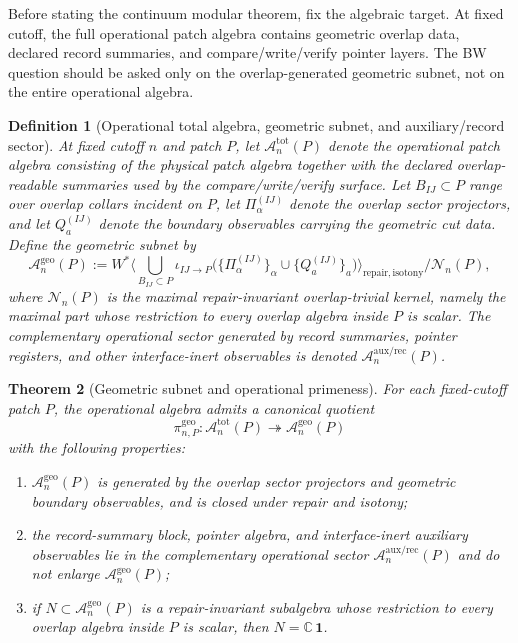 \documentclass[11pt]{article}
\newtheorem{theorem}{Theorem}[section]
\newtheorem{definition}[theorem]{Definition}
\begin{document}
Before stating the continuum modular theorem, fix the algebraic target. At fixed cutoff, the full operational patch algebra contains geometric overlap data, declared record summaries, and compare/write/verify pointer layers. The BW question should be asked only on the overlap-generated geometric subnet, not on the entire operational algebra.

\begin{definition}[Operational total algebra, geometric subnet, and auxiliary/record sector]\label{def:geosubnet}
At fixed cutoff \(n\) and patch \(P\), let \(\mathcal A_n^{\mathrm{tot}}(P)\) denote the operational patch algebra consisting of the physical patch algebra together with the declared overlap-readable summaries used by the compare/write/verify surface. Let \(B_{IJ}\subset P\) range over overlap collars incident on \(P\), let \(\Pi_\alpha^{(IJ)}\) denote the overlap sector projectors, and let \(Q_a^{(IJ)}\) denote the boundary observables carrying the geometric cut data. Define the geometric subnet by
\[
\mathcal A_n^{\mathrm{geo}}(P)
:=
W^\ast\!\Big\langle
\bigcup_{B_{IJ}\subset P}
\iota_{IJ\to P}\!\bigl(
\{\Pi_\alpha^{(IJ)}\}_\alpha\cup\{Q_a^{(IJ)}\}_a
\bigr)
\Big\rangle_{\mathrm{repair,isotony}}
\Big/
\mathcal N_n(P),
\]
where \(\mathcal N_n(P)\) is the maximal repair-invariant overlap-trivial kernel, namely the maximal part whose restriction to every overlap algebra inside \(P\) is scalar. The complementary operational sector generated by record summaries, pointer registers, and other interface-inert observables is denoted \(\mathcal A_n^{\mathrm{aux/rec}}(P)\).
\end{definition}

\begin{theorem}[Geometric subnet and operational primeness]\label{thm:geosubnet}
For each fixed-cutoff patch \(P\), the operational algebra admits a canonical quotient
\[
\pi_{n,P}^{\mathrm{geo}}:\mathcal A_n^{\mathrm{tot}}(P)\twoheadrightarrow \mathcal A_n^{\mathrm{geo}}(P)
\]
with the following properties:
\begin{enumerate}[label=\textup{(\roman*)},leftmargin=2em]
\item \(\mathcal A_n^{\mathrm{geo}}(P)\) is generated by the overlap sector projectors and geometric boundary observables, and is closed under repair and isotony;
\item the record-summary block, pointer algebra, and interface-inert auxiliary observables lie in the complementary operational sector \(\mathcal A_n^{\mathrm{aux/rec}}(P)\) and do not enlarge \(\mathcal A_n^{\mathrm{geo}}(P)\);
\item if \(N\subset \mathcal A_n^{\mathrm{geo}}(P)\) is a repair-invariant subalgebra whose restriction to every overlap algebra inside \(P\) is scalar, then \(N=\mathbb C\,\mathbf 1\).
\end{enumerate}
\end{theorem}
\end{document}
